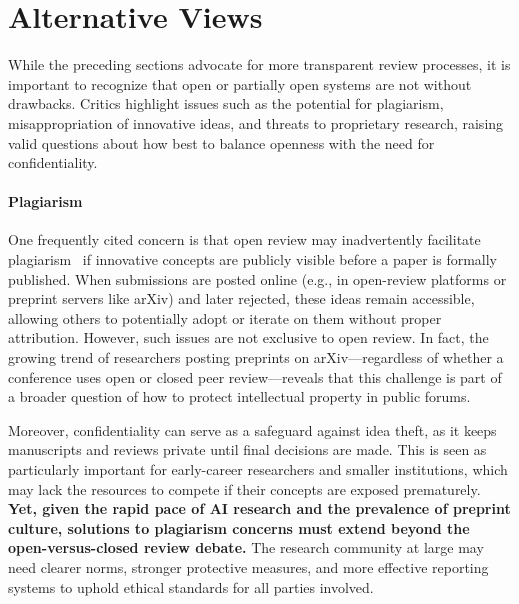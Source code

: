 \section{Alternative Views}

While the preceding sections advocate for more transparent review processes, it is important to recognize that open or partially open systems are not without drawbacks. Critics highlight issues such as the potential for plagiarism, misappropriation of innovative ideas, and threats to proprietary research, raising valid questions about how best to balance openness with the need for confidentiality.

\paragraph{Plagiarism} 
One frequently cited concern is that open review may inadvertently facilitate plagiarism~\cite{piniewski2024emerging, oviedo2024review} if innovative concepts are publicly visible before a paper is formally published. When submissions are posted online (e.g., in open-review platforms or preprint servers like arXiv) and later rejected, these ideas remain accessible, allowing others to potentially adopt or iterate on them without proper attribution. However, such issues are not exclusive to open review. In fact, the growing trend of researchers posting preprints on arXiv—regardless of whether a conference uses open or closed peer review—reveals that this challenge is part of a broader question of how to protect intellectual property in public forums.

Moreover, confidentiality can serve as a safeguard against idea theft, as it keeps manuscripts and reviews private until final decisions are made. This is seen as particularly important for early-career researchers and smaller institutions, which may lack the resources to compete if their concepts are exposed prematurely. \textbf{Yet, given the rapid pace of AI research and the prevalence of preprint culture, solutions to plagiarism concerns must extend beyond the open-versus-closed review debate.} The research community at large may need clearer norms, stronger protective measures, and more effective reporting systems to uphold ethical standards for all parties involved.



